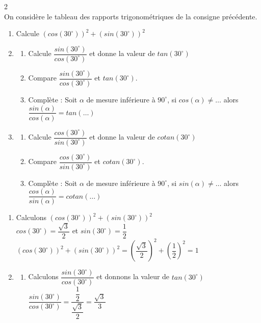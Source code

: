 \begin{multicols*}{2}
  	\\
  	On considère le tableau des rapports trigonométriques de la consigne précédente. \\
  	\begin{enumerate}
  		\item Calcule $ (cos(30^\circ))^2+ (sin(30^\circ))^2 $
  		\item \begin{enumerate} \item Calcule $ \dfrac{sin(30^\circ)}{cos(30^\circ)}  $ et donne la valeur de $ tan(30^\circ ) $ 
  			\item Compare $ \dfrac{sin(30^\circ)}{cos(30^\circ)}   $ et $ tan(30^\circ ) $.
  			\item Complète : \og Soit $ \alpha $ de mesure inférieure à $ 90^\circ $, si $ cos(\alpha)\neq \dots  $ alors $ \dfrac{sin(\alpha)}{cos(\alpha)} =tan(\dotsc ) $ \fg{}
  		\end{enumerate}
  		\item \begin{enumerate} \item Calcule $ \dfrac{cos(30^\circ)}{sin(30^\circ)}  $ et donne la valeur de $ cotan(30^\circ ) $ 
  			\item Compare $ \dfrac{cos(30^\circ)}{sin(30^\circ)}   $ et $ cotan(30^\circ ) $.
  			\item Complète : \og Soit $ \alpha $ de mesure inférieure à $ 90^\circ $, si $ sin(\alpha)\neq \dots  $ alors $ \dfrac{cos(\alpha)}{sin(\alpha)} =cotan(\dotsc ) $ \fg{}
  		\end{enumerate}
  	\end{enumerate}
  	\dure 
  	\resul
  	\begin{enumerate}
  		\item Calculons $ (cos(30^\circ))^2+ (sin(30^\circ))^2 $\\
  		$cos(30^\circ)=\dfrac{\sqrt{3}}{2} $ et  $sin(30^\circ)=\dfrac{1}{2} $\\
  		$ (cos(30^\circ))^2+ (sin(30^\circ))^2=(\dfrac{\sqrt{3}}{2})^2+(\dfrac{1}{2})^2=1 $
  		\item \begin{enumerate} \item Calculons $ \dfrac{sin(30^\circ)}{cos(30^\circ)}  $ et donnons la valeur de $ tan(30^\circ ) $ \\
  			$ \dfrac{sin(30^\circ)}{cos(30^\circ)}= \dfrac{\dfrac{1}{2}}{\dfrac{\sqrt{3}}{2}}=\dfrac{\sqrt{3}}{3}$ \\ 

\end{enumerate}
\end{enumerate}
\end{multicols*}
